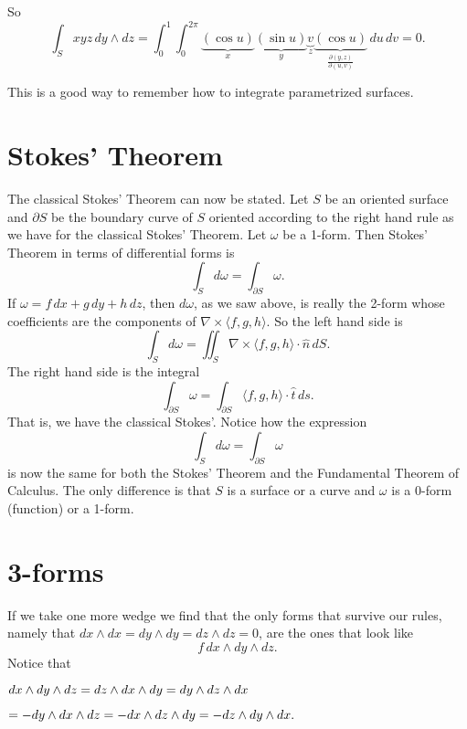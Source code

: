 \documentclass[12pt]{article}
\begin{document}
So
\begin{equation*}
\int_S xyz \, dy \wedge dz
=
\int_0^1
\int_0^{2\pi}
\underbrace{(\cos u)}_{x} \underbrace{(\sin u)}_{y} \underbrace{v}_{z}
\underbrace{( \cos u )}_{\frac{\partial (y,z)}{\partial (u,v)}}
\, du \, dv
= 0 .
\end{equation*}

This is a good way to remember how to integrate parametrized surfaces.

\section*{Stokes' Theorem}

The classical Stokes' Theorem can now be stated.  Let $S$ be an oriented
surface and $\partial S$ be the boundary curve of $S$ oriented according to
the right hand rule as we have for the classical Stokes' Theorem.
Let $\omega$ be a 1-form.  Then Stokes' Theorem in terms of
differential forms is
$$
\int_S d \omega = \int_{\partial S} \omega .
$$
If $\omega = f \, dx + g \, dy + h \, dz$, then
$d \omega$, as we saw above, is really the 2-form whose coefficients are
the components of $\nabla \times \langle f , g, h \rangle$.  So the left 
hand side is
$$
\int_S d \omega = \iint_S 
\nabla \times \langle f , g, h \rangle \cdot \hat{n} \, dS .
$$
The right hand side is the integral 
$$
\int_{\partial S} \omega =
\int_{\partial S} 
\langle f , g, h \rangle \cdot \hat{t} \, ds .
$$
That is,
we have the classical Stokes'.
Notice how the expression
$$
\int_S d \omega = \int_{\partial S} \omega
$$
is now the same for both the Stokes' Theorem and the Fundamental Theorem of
Calculus.  The only difference is that $S$ is a surface or a curve
and 
$\omega$ is a 0-form (function) or a 1-form.

\section*{3-forms}

If we take one more wedge we find that the only forms that survive our
rules, namely that $dx \wedge dx = dy \wedge dy = dz \wedge dz = 0$,
are the ones that look like
$$
f \, dx \wedge dy \wedge dz .
$$
Notice that

$\displaystyle
dx \wedge dy \wedge dz
=
dz \wedge dx \wedge dy
=
dy \wedge dz \wedge dx
\hfill
$

$
\displaystyle
\hfill
=
- 
dy \wedge dx \wedge dz
=
-
dx \wedge dz \wedge dy
=
-
dz \wedge dy \wedge dx .
$
\end{document}
